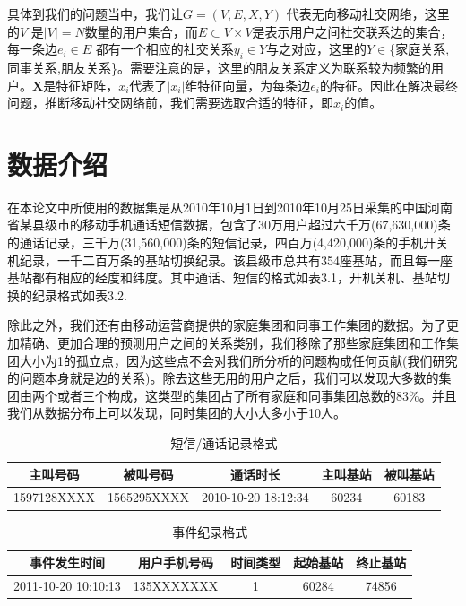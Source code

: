 具体到我们的问题当中，我们让$G = (V, E, X, Y)$ 代表无向移动社交网络，这里的$V$ 是$|V| = N$数量的用户集合，而$E \subset V \times V$是表示用户之间社交联系边的集合，每一条边$e_i \in E$ 都有一个相应的社交关系$y_i \in Y$与之对应，这里的$Y \in $\{家庭关系, 同事关系,朋友关系\}。需要注意的是，这里的朋友关系定义为联系较为频繁的用户。$\textbf{X}$是特征矩阵，$x_i$代表了$|x_i|$维特征向量，为每条边$e_i$的特征。因此在解决最终问题，推断移动社交网络前，我们需要选取合适的特征，即$x_i$的值。



\section{数据介绍}
在本论文中所使用的数据集是从2010年10月1日到2010年10月25日采集的中国河南省某县级市的移动手机通话短信数据，包含了30万用户超过六千万(67,630,000)条的通话记录，三千万(31,560,000)条的短信记录，四百万(4,420,000)条的手机开关机纪录，一千二百万条的基站切换纪录。该县级市总共有354座基站，而且每一座基站都有相应的经度和纬度。其中通话、短信的格式如表3.1，开机关机、基站切换的纪录格式如表3.2.




除此之外，我们还有由移动运营商提供的家庭集团和同事工作集团的数据。为了更加精确、更加合理的预测用户之间的关系类别，我们移除了那些家庭集团和工作集团大小为1的孤立点，因为这些点不会对我们所分析的问题构成任何贡献(我们研究的问题本身就是边的关系)。除去这些无用的用户之后，我们可以发现大多数的集团由两个或者三个构成，这类型的集团占了所有家庭和同事集团总数的83\%。并且我们从数据分布上可以发现，同时集团的大小大多小于10人。


\begin{table}
    \centering
    \caption{短信/通话记录格式}
    \label{call-record}
    \begin{tabular}{c|c|c|c|c}
        \hline
        主叫号码 & 被叫号码 & 通话时长 & 主叫基站 & 被叫基站 \\ \hline
        1597128XXXX & 1565295XXXX & 2010-10-20 18:12:34 & 60234 & 60183 \\ \hline
    \end{tabular}
\end{table}


\begin{table}
    \centering
    \caption{事件纪录格式}
    \label{event-record}
    \begin{tabular}{c|c|c|c|c}
    \hline
    事件发生时间 & 用户手机号码 & 时间类型 & 起始基站 & 终止基站 \\ \hline
    2011-10-20 10:10:13   & 135XXXXXXX & 1 & 60284 & 74856  \\ \hline
    \end{tabular}
\end{table}


